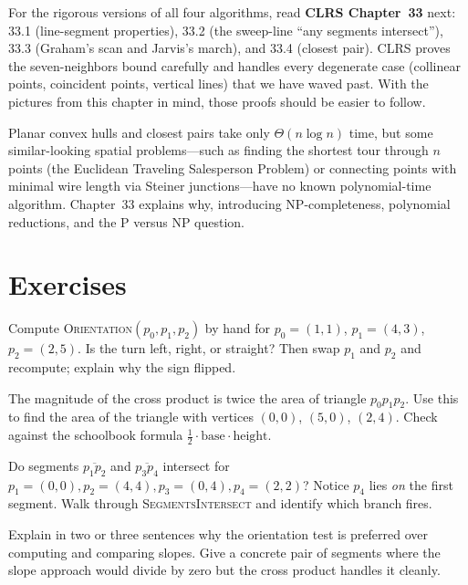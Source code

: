 \begin{marginnotebox}
For the rigorous versions of all four algorithms, read \textbf{CLRS Chapter~33} next: 33.1
(line-segment properties), 33.2 (the sweep-line ``any segments intersect''),
33.3 (Graham's scan and Jarvis's march), and 33.4 (closest pair). CLRS proves the
seven-neighbors bound carefully and handles every degenerate case (collinear
points, coincident points, vertical lines) that we have waved past. With the
pictures from this chapter in mind, those proofs should be easier to follow.
\end{marginnotebox}

Planar convex hulls and closest pairs take only $\Theta(n \log n)$ time, but some similar-looking spatial problems---such as finding the shortest tour through $n$ points (the Euclidean Traveling Salesperson Problem) or connecting points with minimal wire length via Steiner junctions---have no known polynomial-time algorithm. Chapter~33 explains why, introducing NP-completeness, polynomial reductions, and the P versus NP question.

\section*{Exercises}

\begin{exercise}\label{ch32:ex-orient}
Compute \textsc{Orientation}$(p_0,p_1,p_2)$ by hand for
$p_0=(1,1)$, $p_1=(4,3)$, $p_2=(2,5)$. Is the turn left, right, or straight? Then
swap $p_1$ and $p_2$ and recompute; explain why the sign flipped.
\end{exercise}

\begin{exercise}\label{ch32:ex-area}
The magnitude of the cross product is twice the area of triangle $p_0 p_1 p_2$.
Use this to find the area of the triangle with vertices $(0,0)$, $(5,0)$,
$(2,4)$. Check against the schoolbook formula $\tfrac12 \cdot \text{base} \cdot
\text{height}$.
\end{exercise}

\begin{exercise}\label{ch32:ex-seg-touch}
Do segments $\overline{p_1p_2}$ and $\overline{p_3p_4}$ intersect for
$p_1=(0,0), p_2=(4,4), p_3=(0,4), p_4=(2,2)$? Notice $p_4$ lies \emph{on} the
first segment. Walk through \textsc{SegmentsIntersect} and identify which branch
fires.
\end{exercise}

\begin{exercise}\label{ch32:ex-no-div}
Explain in two or three sentences why the orientation test is preferred over
computing and comparing slopes. Give a concrete pair of segments where the slope
approach would divide by zero but the cross product handles it cleanly.
\end{exercise}

